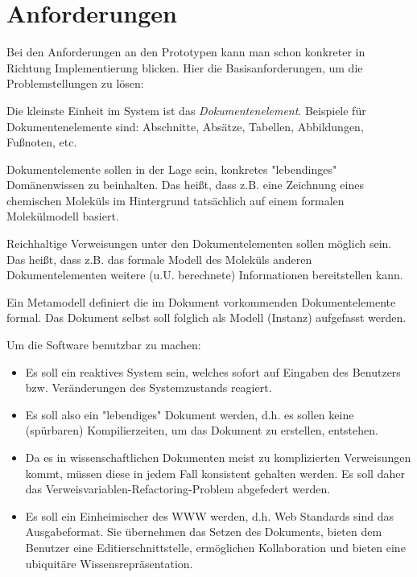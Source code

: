 \section{Anforderungen}

Bei den Anforderungen an den Prototypen kann man schon
konkreter in Richtung Implementierung blicken. Hier die Basisanforderungen,
um die Problemstellungen zu lösen:

Die kleinste Einheit im System ist das \emph{Dokumentenelement}.
Beispiele für Dokumentenelemente sind: Abschnitte, Absätze, Tabellen, Abbildungen, Fußnoten, etc.

Dokumentelemente sollen in der Lage sein, konkretes "lebendinges" Domänenwissen zu beinhalten.
Das heißt, dass z.B. eine Zeichnung eines chemischen Moleküls im Hintergrund tatsächlich
auf einem formalen Molekülmodell basiert.

Reichhaltige Verweisungen unter den Dokumentelementen sollen möglich sein.
Das heißt, dass z.B. das formale Modell des Moleküls
anderen Dokumentelementen weitere (u.U. berechnete) Informationen bereitstellen kann.

Ein Metamodell definiert die im Dokument vorkommenden Dokumentelemente formal.
Das Dokument selbst soll folglich als Modell (Instanz) aufgefasst werden.

Um die Software benutzbar zu machen:

\begin{itemize}
  \item Es soll ein reaktives System sein, welches sofort auf Eingaben des Benutzers bzw. Veränderungen des Systemzustands reagiert.
  \item Es soll also ein "lebendiges" Dokument werden, d.h. es sollen keine (spürbaren) Kompilierzeiten, um das Dokument zu erstellen, entstehen.
  \item Da es in wissenschaftlichen Dokumenten meist zu komplizierten Verweisungen kommt, müssen diese in jedem Fall konsistent gehalten werden. Es soll daher das Verweisvariablen-Refactoring-Problem abgefedert werden.
  \item Es soll ein Einheimischer des WWW werden, d.h. Web Standards sind das Ausgabeformat. Sie übernehmen das Setzen des Dokuments, bieten dem Benutzer eine Editierschnittstelle, ermöglichen Kollaboration und bieten eine ubiquitäre Wissensrepräsentation.
\end{itemize}

